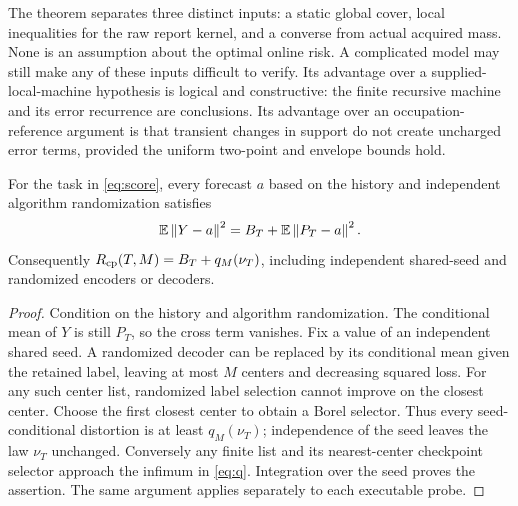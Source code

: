 The theorem separates three distinct inputs: a static global cover, local inequalities for the raw report kernel, and a converse from actual acquired mass. None is an assumption about the optimal online risk. A complicated model may still make any of these inputs difficult to verify. Its advantage over a supplied-local-machine hypothesis is logical and constructive: the finite recursive machine and its error recurrence are conclusions. Its advantage over an occupation-reference argument is that transient changes in support do not create uncharged error terms, provided the uniform two-point and envelope bounds hold.

\begin{lemma}\label{lem:projection}
For the task in \eqref{eq:score}, every forecast $a$ based on the history and independent algorithm randomization satisfies
\begin{equation}\label{eq:projection}
 \mathbb E\left\lVert Y-a\right\rVert^2=B_T+\mathbb E\left\lVert P_T-a\right\rVert^2.
\end{equation}
Consequently $R_{\mathrm{cp}}(T,M)=B_T+q_M(\nu_T)$, including independent shared-seed and randomized encoders or decoders.
\end{lemma}
\begin{proof}
Condition on the history and algorithm randomization. The conditional mean of $Y$ is still $P_T$, so the cross term vanishes. Fix a value of an independent shared seed. A randomized decoder can be replaced by its conditional mean given the retained label, leaving at most $M$ centers and decreasing squared loss. For any such center list, randomized label selection cannot improve on the closest center. Choose the first closest center to obtain a Borel selector. Thus every seed-conditional distortion is at least $q_M(\nu_T)$; independence of the seed leaves the law $\nu_T$ unchanged. Conversely any finite list and its nearest-center checkpoint selector approach the infimum in \eqref{eq:q}. Integration over the seed proves the assertion. The same argument applies separately to each executable probe.
\end{proof}


